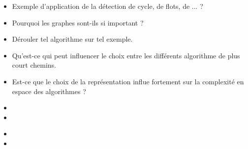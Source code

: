 \documentclass{agregfiche}
\begin{document}
\secquestionsclassiques

\begin{itemize}
    \item Exemple d'application de la détection de cycle, de flots, de ... ?
    \item Pourquoi les graphes sont-ils si important ?
    \item Dérouler tel algorithme sur tel exemple.
    \item Qu'est-ce qui peut influencer le choix entre les différents algorithme de plus court chemins.
    \item Est-ce que le choix de la représentation influe fortement sur la complexité en espace des algorithmes ?
\end{itemize}

\secreferences

\begin{itemize}
    \item 
    \item 
\end{itemize}

\secdev

\begin{itemize}
	\item 
	\item 
\end{itemize}
\end{document}
